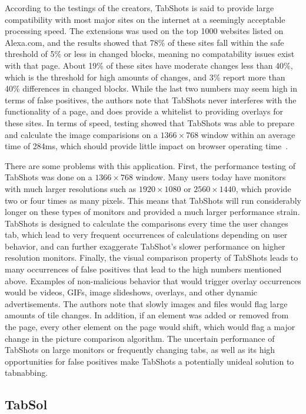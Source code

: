 \documentclass[12pt]{article}
\begin{document}
\begin{doublespace}
According to the testings of the creators, TabShots is said to provide large compatibility with most major sites on the internet at a seemingly acceptable processing speed.  The extensions was used on the top 1000 websites listed on Alexa.com, and the results showed that 78\% of these sites fall within the safe threshold of 5\% or less in changed blocks, meaning no compatability issues exist with that page.  About 19\% of these sites have moderate changes less than 40\%, which is the threshold for high amounts of changes, and 3\% report more than 40\% differences in changed blocks.  While the last two numbers may seem high in terms of false positives, the authors note that TabShots never interferes with the functionality of a page, and does provide a whitelist to providing overlays for these sites.  In terms of speed, testing showed that TabShots was able to prepare and calculate the image comparisions on a $1366 \times 768$ window within an average time of 284ms, which should provide little impact on browser operating time~\cite{TabShots}.

There are some problems with this application.  First, the performance testing of TabShots was done on a $1366 \times 768$ window.  Many users today have monitors with much larger resolutions such as $1920 \times 1080$ or $2560 \times 1440$, which provide two or four times as many pixels.  This means that TabShots will run considerably longer on these types of monitors and provided a much larger performance strain.  TabShots is designed to calculate the comparisons every time the user changes tab, which lead to very frequent occurrences of calculations depending on user behavior, and can further exaggerate TabShot's slower performance on higher resolution monitors.  Finally, the visual comparison property of TabShots leads to many occurrences of false positives that lead to the high numbers mentioned above.  Examples of non-malicious behavior that would trigger overlay occurrences would be videos, GIFs, image slideshows, overlays, and other dynamic advertisements.  The authors note that slowly images and files would flag large amounts of tile changes.  In addition, if an element was added or removed from the page, every other element on the page would shift, which would flag a major change in the picture comparison algorithm.  The uncertain performance of TabShots on large monitors or frequently changing tabs, as well as its high opportunities for false positives make TabShots a potentially unideal solution to tabnabbing. 
\subsection{TabSol}
\begin{comment}
Another defense against tabnabbing, TabSol created by Amandeep Singh and Somanath Tripathy~\cite{TabSol}, compares the hash values of the web page to detect changes and notifies the user. 
\end{comment}


\end{doublespace}
\end{document}
